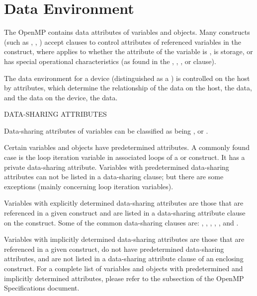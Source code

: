 \pagebreak
\chapter{Data Environment}
\label{chap:data_environment}
The OpenMP  contains data attributes of variables and
objects.  Many constructs (such as , , ) 
accept clauses to control  attributes
of referenced variables in the construct, where  applies to
whether the attribute of the variable is , 
is  storage, or has special operational characteristics 
(as found in the , , , or  clause).

The data environment for a device (distinguished as a )
is controlled on the host by  attributes, which determine the
relationship of the data on the host, the  data, and the data on the
device, the  data.

\bigskip
DATA-SHARING ATTRIBUTES

Data-sharing attributes of variables can be classified as being ,
 or .

Certain variables and objects have predetermined attributes.  
A commonly found case is the loop iteration variable in associated loops 
of a  or  construct. It has a private data-sharing attribute.
Variables with predetermined data-sharing attributes can not be listed in a data-sharing clause; but there are some
exceptions (mainly concerning loop iteration variables).

Variables with explicitly determined data-sharing attributes are those that are
referenced in a given construct and are listed in a data-sharing attribute
clause on the construct. Some of the common data-sharing clauses are:
, , , , 
, and . %

Variables with implicitly determined data-sharing attributes are those
that are referenced in a given construct, do not have predetermined
data-sharing attributes, and are not listed in a data-sharing
attribute clause of an enclosing construct.
For a complete list of variables and objects with predetermined and
implicitly determined attributes, please refer to the
subsection of the OpenMP Specifications document.  


